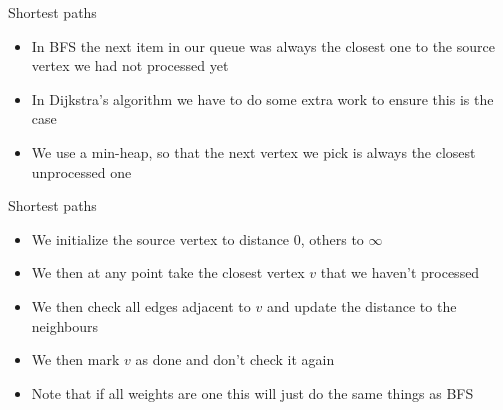 \documentclass{beamer}
\begin{document}
\begin{frame}[plain]{Shortest paths}
    \begin{itemize}
        \item In BFS the next item in our queue was always the closest one to the source vertex we had not processed yet
        \item In Dijkstra's algorithm we have to do some extra work to ensure this is the case
        \item We use a min-heap, so that the next vertex we pick is always the closest unprocessed one
    \end{itemize}
\end{frame}

\begin{frame}[plain]{Shortest paths}
    \begin{itemize}
        \item We initialize the source vertex to distance $0$, others to $\infty$
        \item We then at any point take the closest vertex $v$ that we haven't processed
        \item We then check all edges adjacent to $v$ and update the distance to the neighbours
        \item We then mark $v$ as done and don't check it again
        \item Note that if all weights are one this will just do the same things as BFS
    \end{itemize}
\end{frame}
\end{document}
